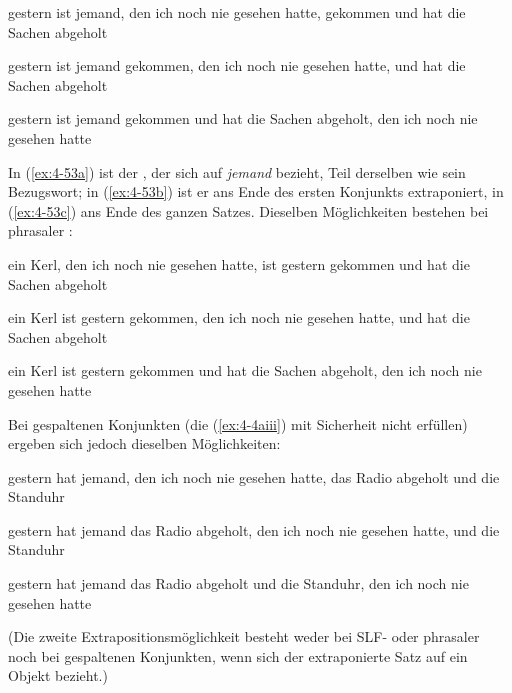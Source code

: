 \documentclass[output=paper]{langsci/langscibook}
\begin{document}
\begin{exe}
\ex
\label{ex:4-53}
\begin{xlist}
\ex%
\label{ex:4-53a}
gestern ist jemand, den ich noch nie gesehen hatte, gekommen und hat die Sachen abgeholt

\ex%
\label{ex:4-53b}
gestern ist jemand gekommen, den ich noch nie gesehen hatte, und hat die Sachen abgeholt

\ex%
\label{ex:4-53c}
gestern ist jemand gekommen und hat die Sachen abgeholt, den ich noch nie gesehen hatte
\end{xlist}
\end{exe}
In (\ref{ex:4-53a}) ist der , der sich auf \textit{jemand} bezieht, Teil derselben  wie sein Bezugswort; in (\ref{ex:4-53b}) ist er ans Ende des ersten Konjunkts extraponiert, in (\ref{ex:4-53c}) ans Ende des ganzen Satzes. Dieselben Möglichkeiten bestehen bei phrasaler :

\begin{exe}
\ex
\label{ex:4-54}
\begin{xlist}
\ex%
\label{ex:4-54a}
ein Kerl, den ich noch nie gesehen hatte, ist gestern gekommen und hat die Sachen abgeholt


\ex%
\label{ex:4-54b}
ein Kerl ist gestern gekommen, den ich noch nie gesehen hatte, und hat die Sachen abgeholt

\ex%
\label{ex:4-54c}
ein Kerl ist gestern gekommen und hat die Sachen abgeholt, den ich noch nie gesehen hatte
\end{xlist}
\end{exe}
Bei gespaltenen Konjunkten (die (\ref{ex:4-4aiii}) mit Sicherheit nicht erfüllen) ergeben sich jedoch dieselben Möglichkeiten:

\begin{exe}
\ex
\label{ex:4-55}
\begin{xlist}
\ex%
\label{ex:4-55a}
gestern hat jemand, den ich noch nie gesehen hatte, das Radio abgeholt und die Standuhr

\ex%
\label{ex:4-55b}
gestern hat jemand das Radio abgeholt, den ich noch nie gesehen hatte, und die Standuhr

\ex%
\label{ex:4-55c}
gestern hat jemand das Radio abgeholt und die Standuhr, den ich noch nie gesehen hatte
\end{xlist}
\end{exe}
(Die zweite Extrapositionsmöglichkeit besteht weder bei SLF- oder phrasaler  noch bei gespaltenen Konjunkten, wenn sich der extraponierte Satz auf ein Objekt bezieht.)
\end{document}
